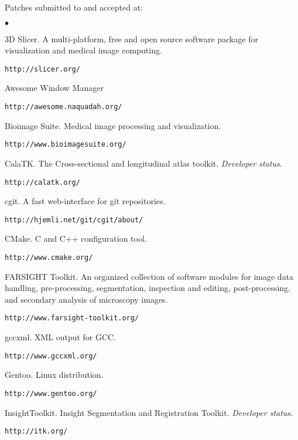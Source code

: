 \documentclass[margin,line]{res}
\newenvironment{list2}{
  \begin{list}{$\bullet$}{%
      \setlength{\itemsep}{0in}
      \setlength{\parsep}{0in} \setlength{\parskip}{0in}
      \setlength{\topsep}{0in} \setlength{\partopsep}{0in} 
      \setlength{\leftmargin}{0.2in}}}{\end{list}}
\begin{document}
\begin{resume}
Patches submitted to and accepted at:
\begin{list2}
\item 3D Slicer.  A multi-platform, free and open source software package for
  visualization and medical image computing.
  \begin{verbatim}http://slicer.org/\end{verbatim}
\item Awesome Window Manager
  \begin{verbatim}http://awesome.naquadah.org/\end{verbatim}
\item Bioimage Suite.  Medical image processing and visualization.
  \begin{verbatim}http://www.bioimagesuite.org/\end{verbatim}
\item CalaTK.  The Cross-sectional and longitudinal atlas toolkit.  \textit{Developer status}.
  \begin{verbatim}http://calatk.org/\end{verbatim}
\item cgit. A fast web-interface for git repositories.
  \begin{verbatim}http://hjemli.net/git/cgit/about/\end{verbatim}
\item CMake.  C and C++ configuration tool.
  \begin{verbatim}http://www.cmake.org/\end{verbatim}
\item FARSIGHT Toolkit.  An organized collection of software modules for image
  data handling, pre-processing, segmentation, inspection and editing,
  post-processing, and secondary analysis of microscopy images.
  \begin{verbatim}http://www.farsight-toolkit.org/\end{verbatim}
\item gccxml.  XML output for GCC.
  \begin{verbatim}http://www.gccxml.org/\end{verbatim}
\item Gentoo.  Linux distribution.
  \begin{verbatim}http://www.gentoo.org/\end{verbatim}
\item InsightToolkit.  Insight Segmentation and Registration Toolkit.  \textit{Developer status}.
  \begin{verbatim}http://itk.org/\end{verbatim}

\end{list2}
\end{resume}
\end{document}
